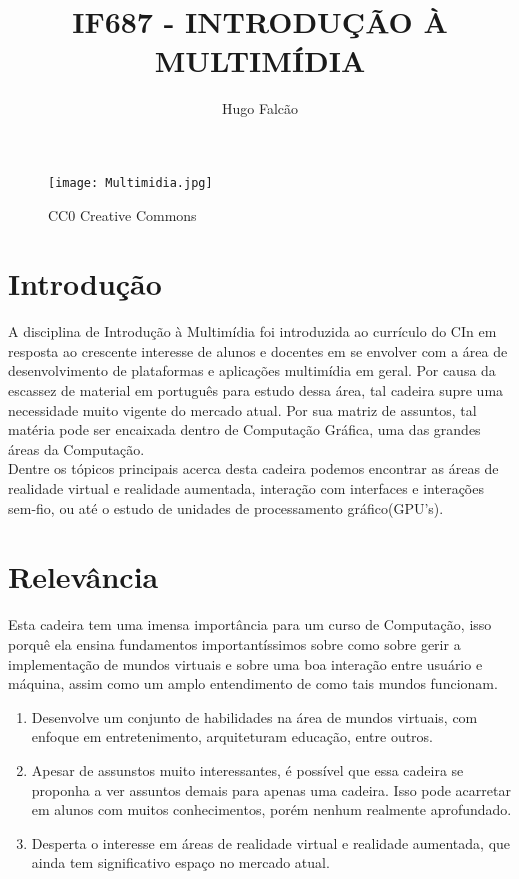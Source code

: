 \documentclass[10pt,a4paper]{article}
\title{IF687 - INTRODUÇÃO À MULTIMÍDIA}
\author{Hugo Falcão}
\begin{document}
\maketitle

\begin{figure}[h!]
\centering
\texttt{[image: Multimidia.jpg]}
\caption{\label{fig:Multimidia}CC0 Creative Commons}
\end{figure}


\section{Introdução}

A disciplina de Introdução à Multimídia foi introduzida ao currículo do CIn em resposta ao crescente interesse de alunos e docentes em se envolver com a área de desenvolvimento de plataformas e aplicações multimídia em geral. Por causa da escassez de material em português para estudo dessa área, tal cadeira supre uma necessidade muito vigente do mercado atual. Por sua matriz de assuntos, tal matéria pode ser encaixada dentro de Computação Gráfica, uma das grandes áreas da Computação.
\cite{siteCadeira}
    \\
    Dentre os tópicos principais acerca desta cadeira podemos encontrar as áreas de realidade virtual e realidade aumentada, interação com interfaces e interações sem-fio, ou até o estudo de unidades de processamento gráfico(GPU's).

\section{Relevância}
Esta cadeira tem uma imensa importância para um curso de Computação, isso porquê ela ensina fundamentos importantíssimos sobre como sobre gerir a implementação de mundos virtuais e sobre uma boa interação entre usuário e máquina, assim como um amplo entendimento de como tais mundos funcionam.

 \begin{enumerate}
 \item Desenvolve um conjunto de habilidades na área de mundos virtuais, com enfoque em entretenimento, arquiteturam educação, entre outros. 
 
 \item Apesar de assunstos muito interessantes, é possível que essa cadeira se proponha a ver assuntos demais para apenas uma cadeira. Isso pode acarretar em alunos com muitos conhecimentos, porém nenhum realmente aprofundado.
 
 \item Desperta o interesse em áreas de realidade virtual e realidade aumentada, que ainda tem significativo espaço no mercado atual.
 
 \end{enumerate}
\end{document}
